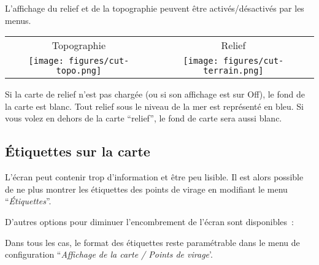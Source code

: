 L'affichage du relief et de la topographie peuvent être activés/désactivés par les menus.

\begin{center}
\begin{tabular}{c c}
Topographie & Relief \\
\texttt{[image: figures/cut-topo.png]} &
\texttt{[image: figures/cut-terrain.png]}
\end{tabular}
\end{center}

Si la carte de relief n'est pas chargée (ou si son affichage est sur Off), le fond de la carte est blanc. Tout relief sous le niveau de la mer est représenté en bleu. Si vous volez en dehors de la carte ``relief'', le fond de carte sera aussi blanc.

\subsection*{Étiquettes sur la carte}\label{sec:maplabels}

L'écran peut contenir trop d'information et être peu lisible.
Il est alors possible de ne plus montrer les étiquettes des points de virage en modifiant le menu ``\emph{Étiquettes}''.

D'autres options pour diminuer l'encombrement de l'écran sont disponibles~:


Dans tous les cas, le format des étiquettes reste paramétrable dans le menu de configuration ``\emph{Affichage de la carte / Points de virage}'. 

